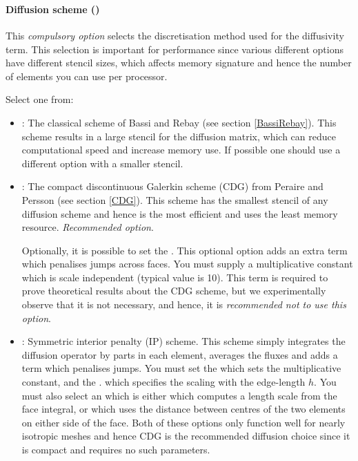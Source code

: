  \\
 \\

\paragraph{Diffusion scheme ()} 
This \emph{compulsory option} selects the discretisation method used
for the diffusivity term. This selection is important for performance
since various different options have different stencil sizes, which
affects memory signature and hence the number of elements you can use
per processor.

Select one from:
\begin{itemize}
\item {}: The classical scheme of Bassi and Rebay (see
  section \ref{BassiRebay}). This scheme results in a large stencil
  for the diffusion matrix, which can reduce computational speed and
  increase memory use. If possible one should use a different option
  with a smaller stencil.
\item {}: The compact
  discontinuous Galerkin scheme (CDG) from Peraire and Persson
  \citep{peraire2008} (see section \ref{CDG}). This scheme has the
  smallest stencil of any diffusion scheme and hence is the most
  efficient and uses the least memory resource. \emph{Recommended
    option}.

  Optionally, it is possible to set the
  . This
  optional option adds an extra term which penalises jumps across
  faces. You must supply a multiplicative constant which is scale
  independent (typical value is 10). This term is required to prove
  theoretical results about the CDG scheme, but we experimentally
  observe that it is not necessary, and hence, it is \emph{recommended
    not to use this option}.
\item {}: Symmetric interior penalty (IP)
  scheme. This scheme simply integrates the diffusion operator by
  parts in each element, averages the fluxes and adds a term which
  penalises jumps. You must set the 
   which sets the
  multiplicative constant, and the .
  which specifies the scaling with the edge-length $h$. You must also
  select an  which is either
   which computes a length scale from the
  face integral, or  which uses the
  distance between centres of the two elements on either side of the
  face. Both of these options only function well for nearly isotropic
  meshes and hence CDG is the recommended diffusion choice since it 
  is compact and requires no such parameters.
\end{itemize}

